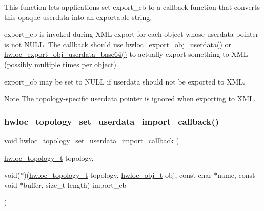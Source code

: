 This function lets applications set {\ttfamily export\+\_\+cb} to a callback function that converts this opaque userdata into an exportable string.

{\ttfamily export\+\_\+cb} is invoked during X\+ML export for each object whose {\ttfamily userdata} pointer is not {\ttfamily N\+U\+LL}. The callback should use \hyperlink{a00206_gaa541bdd628416dbbe97d0df69d3de958}{hwloc\+\_\+export\+\_\+obj\+\_\+userdata()} or \hyperlink{a00206_ga1b7358137cec27bd073f58a606ecbaba}{hwloc\+\_\+export\+\_\+obj\+\_\+userdata\+\_\+base64()} to actually export something to X\+ML (possibly multiple times per object).

{\ttfamily export\+\_\+cb} may be set to {\ttfamily N\+U\+LL} if userdata should not be exported to X\+ML.

\begin{DoxyNote}{Note}
The topology-\/specific userdata pointer is ignored when exporting to X\+ML. 
\end{DoxyNote}
\mbox{\label{a00206_ga5ac6917ea7289955fb1ffda4353af9b0}} 
\subsubsection{\texorpdfstring{hwloc\+\_\+topology\+\_\+set\+\_\+userdata\+\_\+import\+\_\+callback()}{hwloc\_topology\_set\_userdata\_import\_callback()}}
{\footnotesize\ttfamily void hwloc\+\_\+topology\+\_\+set\+\_\+userdata\+\_\+import\+\_\+callback (\begin{DoxyParamCaption}\item[{\hyperlink{a00186_ga9d1e76ee15a7dee158b786c30b6a6e38}{hwloc\+\_\+topology\+\_\+t}}]{topology,  }\item[{void($\ast$)(\hyperlink{a00186_ga9d1e76ee15a7dee158b786c30b6a6e38}{hwloc\+\_\+topology\+\_\+t} topology, \hyperlink{a00185_ga79b8ab56877ef99ac59b833203391c7d}{hwloc\+\_\+obj\+\_\+t} obj, const char $\ast$name, const void $\ast$buffer, size\+\_\+t length)}]{import\+\_\+cb }\end{DoxyParamCaption})}



